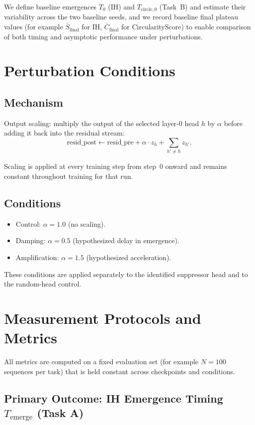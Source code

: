 \documentclass[11pt]{article}
\begin{document}
We define baseline emergences $T_0$ (IH) and $T_{\text{circle},0}$ (Task~B) and estimate their variability across the two baseline seeds, and we record baseline final plateau values (for example $\bar{S}_{\text{final}}$ for IH, $\bar{C}_{\text{final}}$ for CircularityScore) to enable comparison of both timing and asymptotic performance under perturbations.

\section{Perturbation Conditions}

\subsection{Mechanism}

Output scaling: multiply the output of the selected layer-0 head $h$ by $\alpha$ before adding it back into the residual stream:
\[
  \mathrm{resid\_post} \leftarrow \mathrm{resid\_pre} + \alpha \cdot z_h + \sum_{h' \neq h} z_{h'}.
\]

Scaling is applied at every training step from step~0 onward and remains constant throughout training for that run.

\subsection{Conditions}

\begin{itemize}
  \item Control: $\alpha = 1.0$ (no scaling).
  \item Damping: $\alpha = 0.5$ (hypothesized delay in emergence).
  \item Amplification: $\alpha = 1.5$ (hypothesized acceleration).
\end{itemize}

These conditions are applied separately to the identified suppressor head and to the random-head control.

\section{Measurement Protocols and Metrics}

All metrics are computed on a fixed evaluation set (for example $N = 100$ sequences per task) that is held constant across checkpoints and conditions.

\subsection{Primary Outcome: IH Emergence Timing $T_{\text{emerge}}$ (Task A)}
\end{document}
